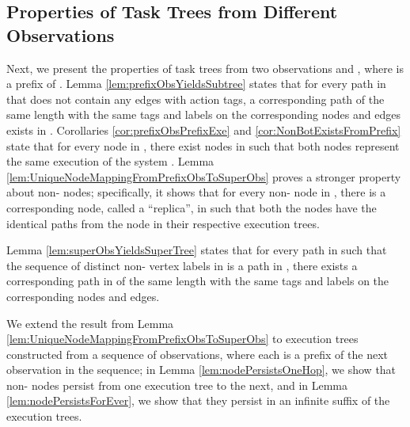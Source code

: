 \documentclass[11pt]{article}
\numberwithin{theorem}{section}
\begin{document}
\subsection{Properties of Task Trees from Different Observations}\label{subset:PropertiesOfTreesFromPrefixObservations}
Next, we present the properties of task trees from two observations  and , where  is a prefix of . Lemma \ref{lem:prefixObsYieldsSubtree} states that for every path in  that does not contain any edges with  action tags, a corresponding path of the same length with the same tags and labels on the corresponding nodes and edges exists in . Corollaries \ref{cor:prefixObsPrefixExe} and \ref{cor:NonBotExistsFromPrefix} state that for every node in , there exist nodes in  such that both nodes represent the same execution of the system . Lemma \ref{lem:UniqueNodeMappingFromPrefixObsToSuperObs} proves a stronger property about non- nodes; specifically, it shows that for every non- node in , there is a corresponding node, called a ``replica'', in  such that both the nodes have the identical paths from the  node in their respective execution trees.

Lemma \ref{lem:superObsYieldsSuperTree} states that for every path  in  such that the sequence of distinct non- vertex labels in  is a path in , there exists a corresponding path in  of the same length with the same tags and labels on the corresponding nodes and edges. 

We extend the result from Lemma \ref{lem:UniqueNodeMappingFromPrefixObsToSuperObs} to execution trees constructed from a sequence of observations, where each is a prefix of the next observation in the sequence; in Lemma \ref{lem:nodePersistsOneHop}, we show that non- nodes persist from one execution tree to the next, and in Lemma \ref{lem:nodePersistsForEver}, we show that they persist in an infinite suffix of the execution trees. 
\end{document}
